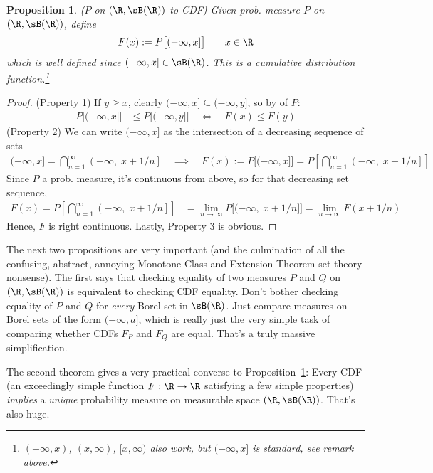 \documentclass[12pt]{article}
\theoremstyle{plain}
\newtheorem{prop}[thm]{Proposition}
\theoremstyle{definition}
\theoremstyle{remark}
\newcommand{\ra}{\rightarrow}
\newcommand{\ninf}{_{n=1}^\infty}
\newcommand{\limn}{\lim_{n\rightarrow\infty}}
\begin{document}
\begin{prop}\emph{($P$ on $(\R,\sB(\R))$ to CDF)}
\label{prop:ptocdf}
Given prob. measure $P$ on $(\R,\sB(\R))$, define
\begin{align*}
  F(x) := P\big[(-\infty,x]\big]
  \qquad x\in\R
\end{align*}
which is well defined since $(-\infty,x]\in\sB(\R)$.
This is a cumulative distribution function.\footnote{%
  $(-\infty,x)$, $(x,\infty)$, $[x,\infty)$ also work, but $(-\infty,x]$
  is standard, see remark above.
}
\end{prop}
\begin{proof}
(Property 1)
If $y \geq x$, clearly $(-\infty,x]\subseteq (-\infty,y]$, so by of $P$:
\begin{align*}
  P\big[(-\infty,x]\big]
  &\leq
  P\big[(-\infty,y]\big]
  \quad\iff\quad
  F(x) \leq F(y)
\end{align*}
(Property 2)
We can write $(-\infty,x]$ as the intersection of a decreasing
sequence of sets
\begin{align*}
  (-\infty,x] = \bigcap\ninf \left(-\infty, \; x+1/n\right]
  \quad\implies\quad
  F(x) := P\big[(-\infty,x]\big]
    = P\left[\bigcap\ninf \left(-\infty, \; x+1/n\right]\right]
\end{align*}
Since $P$ a prob. measure, it's continuous from above, so for that
decreasing set sequence,
\begin{align*}
  F(x)
  = P\left[ \bigcap\ninf \left(-\infty, \; x+1/n\right] \right]
  &=\limn P\big[ (-\infty, \; x+1/n]\big]
  = \limn F(x+1/n)
\end{align*}
Hence, $F$ is right continuous.
Lastly, Property 3 is obvious.
\end{proof}

The next two propositions are very important (and the culmination of all
the confusing, abstract, annoying Monotone Class and Extension Theorem
set theory nonsense).
The first says that checking equality of two measures $P$ and $Q$ on
$(\R,\sB(\R))$ is equivalent to checking CDF equality. Don't bother
checking equality of $P$ and $Q$ for \emph{every} Borel set in
$\sB(\R)$.  Just compare measures on Borel sets of the form
$(-\infty,a]$, which is really just the very simple task of comparing
whether CDFs $F_P$ and $F_Q$ are equal. That's a truly massive
simplification.

The second theorem gives a very practical converse to
Proposition~\ref{prop:ptocdf}: Every CDF (an exceedingly simple function
$F:\R\ra\R$ satisfying a few simple properties) \emph{implies} a
\emph{unique} probability measure on measurable space $(\R,\sB(\R))$.
That's also huge.
\end{document}
